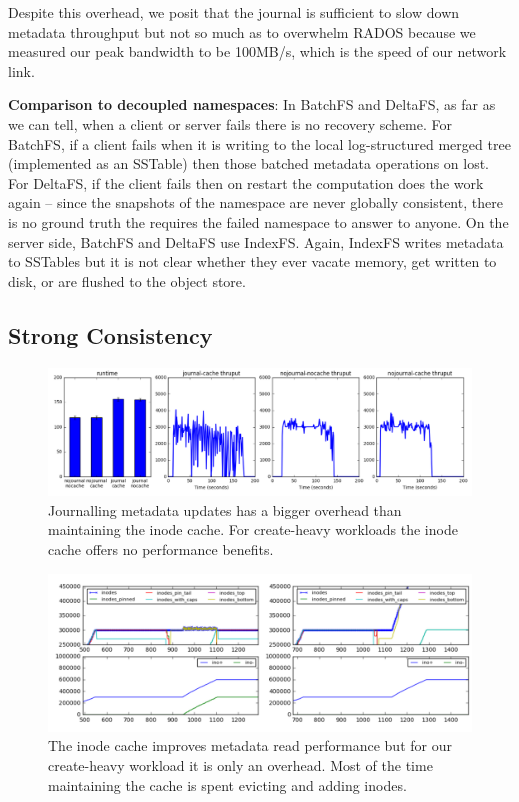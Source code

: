 \documentclass[preprint]{sigplanconf-eurosys}
\begin{document}
Despite this overhead, we posit that the journal is sufficient to slow down
metadata throughput but not so much as to overwhelm RADOS because we measured
our peak bandwidth to be 100MB/s, which is the speed of our network link.

\textbf{Comparison to decoupled namespaces}: In BatchFS and DeltaFS, as far as
we can tell, when a client or server fails there is no recovery scheme. For
BatchFS, if a client fails when it is writing to the local log-structured
merged tree (implemented as an SSTable) then those batched metadata operations
on lost. For DeltaFS, if the client fails then on restart the computation does
the work again -- since the snapshots of the namespace are never globally
consistent, there is no ground truth the requires the failed namespace to
answer to anyone. On the server side, BatchFS and DeltaFS use IndexFS. Again,
IndexFS writes metadata to SSTables but it is not clear whether they ever
vacate memory, get written to disk, or are flushed to the object store.

\subsection{Strong Consistency} 

\begin{figure}[tb]%
\centering
\includegraphics[width=180mm]{figures/throughput-cache-journal.png}
\caption{Journalling metadata updates has a bigger overhead than maintaining
the inode cache. For create-heavy workloads the inode cache offers no
performance benefits. }\label{fig:throughput-cache-journal}
\end{figure}

\begin{figure}[tb]%
\centering
\includegraphics[width=180mm]{figures/inode-cache.png}
\caption{The inode cache improves metadata read performance but for our
create-heavy workload it is only an overhead. Most of the time maintaining the
cache is spent evicting and adding inodes.}\label{fig:inode-cache}
\end{figure}
\end{document}
